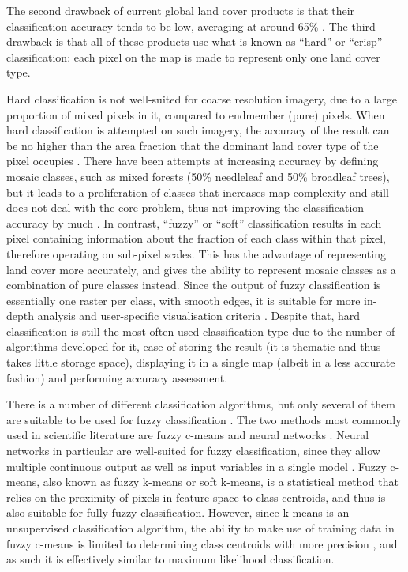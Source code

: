 \documentclass[a4paper,10pt]{article}
\begin{document}
The second drawback of current global land cover products is that their classification accuracy tends to be low, averaging at around 65\% \citep{tsendbazar2016integrating}. The third drawback is that all of these products use what is known as ``hard'' or ``crisp'' classification: each pixel on the map is made to represent only one land cover type.

Hard classification is not well-suited for coarse resolution imagery, due to a large proportion of mixed pixels in it, compared to endmember (pure) pixels. When hard classification is attempted on such imagery, the accuracy of the result can be no higher than the area fraction that the dominant land cover type of the pixel occupies \citep{latifovic2004accuracy}. There have been attempts at increasing accuracy by defining mosaic classes, such as mixed forests (50\% needleleaf and 50\% broadleaf trees), but it leads to a proliferation of classes that increases map complexity and still does not deal with the core problem, thus not improving the classification accuracy by much \citep{tsendbazar2016comparative}. In contrast, ``fuzzy'' or ``soft'' classification results in each pixel containing information about the fraction of each class within that pixel, therefore operating on sub-pixel scales. This has the advantage of representing land cover more accurately, and gives the ability to represent mosaic classes as a combination of pure classes instead. Since the output of fuzzy classification is essentially one raster per class, with smooth edges, it is suitable for more in-depth analysis and user-specific visualisation criteria \citep{tsendbazar2016integrating}. Despite that, hard classification is still the most often used classification type due to the number of algorithms developed for it, ease of storing the result (it is thematic and thus takes little storage space), displaying it in a single map (albeit in a less accurate fashion) and performing accuracy assessment.

There is a number of different classification algorithms, but only several of them are suitable to be used for fuzzy classification \citep{nath2014methods}. The two methods most commonly used in scientific literature are fuzzy c-means and neural networks \citep{zhang2001fullyfuzzy}. Neural networks in particular are well-suited for fuzzy classification, since they allow multiple continuous output as well as input variables in a single model \citep{foody1997fuzzynnet}. Fuzzy c-means, also known as fuzzy k-means or soft k-means, is a statistical method that relies on the proximity of pixels in feature space to class centroids, and thus is also suitable for fully fuzzy classification. However, since k-means is an unsupervised classification algorithm, the ability to make use of training data in fuzzy c-means is limited to determining class centroids with more precision \citep{hengl2004fuzzycmeans}, and as such it is effectively similar to maximum likelihood classification.
\end{document}
